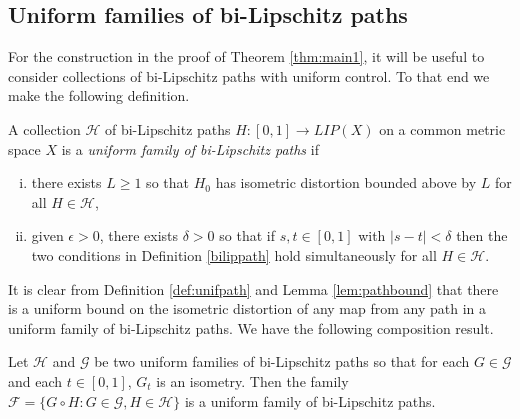 \documentclass{amsart}
\begin{document}
\subsection{Uniform families of bi-Lipschitz paths}

For the construction in the proof of Theorem \ref{thm:main1}, it will be useful to consider collections of bi-Lipschitz paths with uniform control. To that end we make the following definition.

\begin{definition}
\label{def:unifpath}
A collection $\mathcal{H}$ of bi-Lipschitz paths $H: [0,1] \rightarrow LIP(X)$ on a common metric space $X$ is a {\it uniform family of bi-Lipschitz paths} if
\begin{enumerate}[(i)]
\item there exists $L\geq 1$ so that $H_0$ has isometric distortion bounded above by $L$ for all $H\in \mathcal{H}$,
\item given $\epsilon >0$, there exists $\delta >0$ so that if $s,t\in [0,1]$ with $|s-t| <\delta$ then the two conditions in Definition \ref{bilippath} hold simultaneously for all $H \in \mathcal{H}$.
\end{enumerate}
\end{definition}

It is clear from Definition \ref{def:unifpath} and Lemma \ref{lem:pathbound} that there is a uniform bound on the isometric distortion of any map from any path in a uniform family of bi-Lipschitz paths. We have the following composition result.

\begin{lemma}
\label{lem:pathcomp}
Let $\mathcal{H}$ and $\mathcal{G}$ be two uniform families of bi-Lipschitz paths so that for each $G\in \mathcal{G}$ and each $t\in[0,1]$, $G_t$ is an isometry. Then the family $\mathcal{F} = \{ G\circ H : G\in \mathcal{G},H \in \mathcal{H} \}$ is a uniform family of bi-Lipschitz paths.
\end{lemma}
\end{document}
